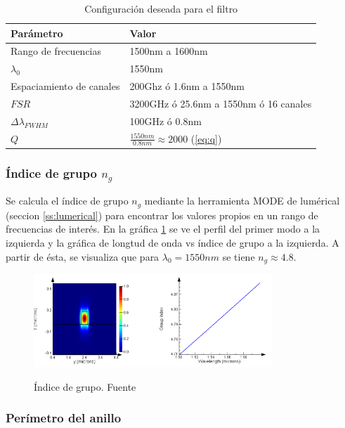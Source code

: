 \begin{table}[H]
\centering
\begin{tabular}{|l|l|}
\hline
Parámetro & Valor \\
\hline
Rango de frecuencias & 1500nm a 1600nm \\ 
$\lambda_0$ & 1550nm \\
Espaciamiento de canales & 200Ghz ó 1.6nm a 1550nm \\
$FSR$ & 3200GHz ó 25.6nm a 1550nm ó 16 canales \\
$\Delta \lambda_{FWHM}$ & 100GHz ó 0.8nm \\
$Q$ & $\frac{1550nm}{0.8nm} \approx 2000$  (\ref{eq:q})\\
\hline
\end{tabular}
\caption{Configuración deseada para el filtro}
\label{tb:lum_params}
\end{table} 

\subsubsection{Índice de grupo $n_g$}

Se calcula el índice de grupo $n_g$ mediante la herramienta MODE de lumérical
(seccion \ref{ss:lumerical}) para encontrar los valores propios en un rango de 
frecuencias de interés. En la gráfica \ref{fig:ng} se
ve el perfil del primer modo a la izquierda y la gráfica de longtud de onda
vs índice de grupo a la izquierda. A partir de ésta, se visualiza que para
$\lambda_0=1550nm$ se tiene $n_g\approx4.8$.

\begin{figure}[h!]
\caption{Índice de grupo. Fuente\cite{Lumerical2009}}
\centering
\includegraphics[width=0.8\textwidth,natwidth=652,natheight=254]{figs/ng.png}
\label{fig:ng}
\end{figure} 

\subsubsection{Perímetro del anillo}

